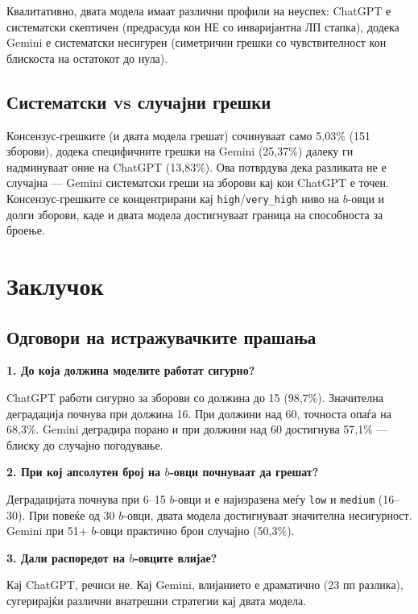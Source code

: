 \documentclass[12pt,a4paper]{article}
\theoremstyle{definition}
\begin{document}
Квалитативно, двата модела имаат различни профили на неуспех: ChatGPT е систематски скептичен (предрасуда кон НЕ со инваријантна ЛП стапка), додека Gemini е систематски несигурен (симетрични грешки со чувствителност кон блискоста на остатокот до нула).

\subsection{Систематски vs случајни грешки}

Консензус-грешките (и двата модела грешат) сочинуваат само 5,03\% (151 зборови), додека специфичните грешки на Gemini (25,37\%) далеку ги надминуваат оние на ChatGPT (13,83\%). Ова потврдува дека разликата не е случајна --- Gemini систематски греши на зборови кај кои ChatGPT е точен. Консензус-грешките се концентрирани кај \texttt{high}/\texttt{very\_high} ниво на $b$-овци и долги зборови, каде и двата модела достигнуваат граница на способноста за броење.

\section{Заклучок}

\subsection{Одговори на истражувачките прашања}

\textbf{1. До која должина моделите работат сигурно?}

ChatGPT работи сигурно за зборови со должина до 15 (98,7\%). Значителна деградација почнува при должина 16. При должини над 60, точноста опаѓа на 68,3\%. Gemini деградира порано и при должини над 60 достигнува 57,1\% --- блиску до случајно погодување.

\textbf{2. При кој апсолутен број на $b$-овци почнуваат да грешат?}

Деградацијата почнува при 6--15 $b$-овци и е најизразена меѓу \texttt{low} и \texttt{medium} (16--30). При повеќе од 30 $b$-овци, двата модела достигнуваат значителна несигурност. Gemini при 51+ $b$-овци практично брои случајно (50,3\%).

\textbf{3. Дали распоредот на $b$-овците влијае?}

Кај ChatGPT, речиси не. Кај Gemini, влијанието е драматично (23 пп разлика), сугерирајќи различни внатрешни стратегии кај двата модела.
\end{document}
